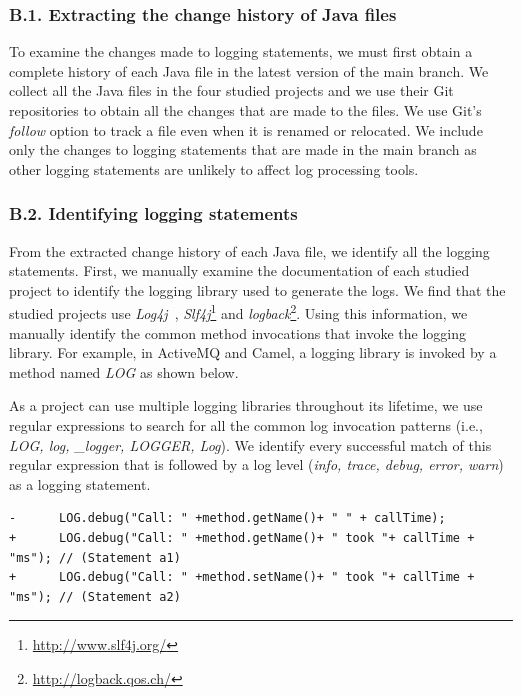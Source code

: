 \subsubsection*{B.1. Extracting the change history of Java files} 
To examine the changes made to logging statements, we must first obtain a complete history of each Java file in the latest version of the main branch.
We collect all the Java files in the four studied projects and we use their Git repositories to obtain all the changes that are made to the files. We use Git's \emph{follow} option to track a file even when it is renamed or relocated. We include only the changes to logging statements that are made in the main branch as other logging statements are unlikely to affect log processing tools. %

\subsubsection*{B.2. Identifying logging statements}
From the extracted change history of each Java file, we identify all the logging statements.
First, we manually examine the documentation of each studied project to identify the logging library used to generate the logs. %
We find that the studied projects use \textsl{Log4j}~\cite{EMSEIAN}, \emph{Slf4j}\footnote{\url{http://www.slf4j.org/}} and \emph{logback}\footnote{\url{http://logback.qos.ch/}}.
Using this information, we manually identify the common method invocations that invoke the logging library. For example, in ActiveMQ and Camel, a logging library is invoked by a method named \emph{LOG} as shown below.


As a project can use multiple logging libraries throughout its lifetime, we use regular expressions to search for all the common log invocation patterns (i.e., \emph{LOG, log, \_logger, LOGGER, Log}). We identify every successful match of this regular expression that is followed by a log level (\emph{info, trace, debug, error, warn}) as a logging statement.
\begin{lstlisting}[caption={Selecting the best matching logging statement}, label={lst:multiplelogs}, float=*]
-      LOG.debug("Call: " +method.getName()+ " " + callTime);
+      LOG.debug("Call: " +method.getName()+ " took "+ callTime + "ms"); // (Statement a1)
+      LOG.debug("Call: " +method.setName()+ " took "+ callTime + "ms"); // (Statement a2)
\end{lstlisting}

